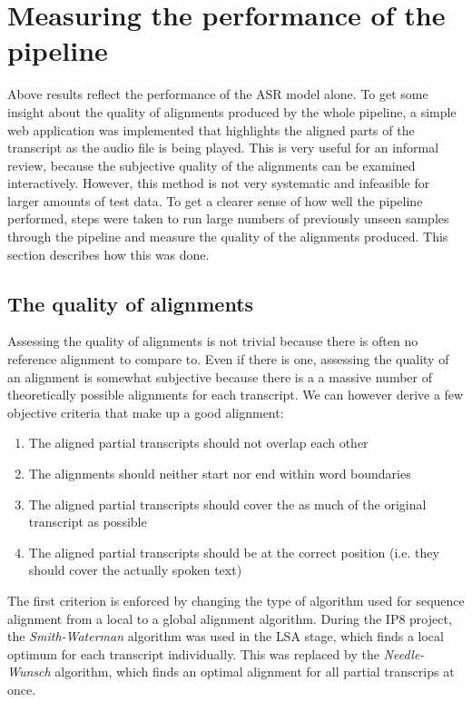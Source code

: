 \section{Measuring the performance of the pipeline}\label{e2e}

Above results reflect the performance of the \ac{ASR} model alone. To get some insight about the quality of alignments produced by the whole pipeline, a simple web application was implemented that highlights the aligned parts of the transcript as the audio file is being played. This is very useful for an informal review, because the subjective quality of the alignments can be examined interactively. However, this method is not very systematic and infeasible for larger amounts of test data. To get a clearer sense of how well the pipeline performed, steps were taken to run large numbers of previously unseen samples through the pipeline and measure the quality of the alignments produced. This section describes how this was done.

\subsection{The quality of alignments}

Assessing the quality of alignments is not trivial because there is often no reference alignment to compare to. Even if there is one, assessing the quality of an alignment is somewhat subjective because there is a a massive number of theoretically possible alignments for each transcript. We can however derive a few objective criteria that make up a good alignment:

\begin{enumerate}
	\item The aligned partial transcripts should not overlap each other
	\item The alignments should neither start nor end within word boundaries
	\item The aligned partial transcripts should cover the as much of the original transcript as possible	
	\item The aligned partial transcripts should be at the correct position (i.e. they should cover the actually spoken text)
\end{enumerate}

The first criterion is enforced by changing the type of algorithm used for sequence alignment from a local to a global alignment algorithm. During the IP8 project, the \textit{Smith-Waterman} algorithm was used in the \ac{LSA} stage, which finds a local optimum for each transcript individually. This was replaced by the \textit{Needle-Wunsch} algorithm, which finds an optimal alignment for all partial transcrips at once. 

